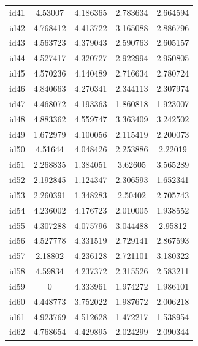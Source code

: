 \documentclass[num-refs]{wiley-article}
\begin{document}
\begin{center}
\begin{longtable}{ccccc}
id41      & 4.53007   & 4.186365       & 2.783634          & 2.664594          \\
id42      & 4.768412  & 4.413722       & 3.165088          & 2.886796          \\
id43      & 4.563723  & 4.379043       & 2.590763          & 2.605157          \\
id44      & 4.527417  & 4.320727       & 2.922994          & 2.950805          \\
id45      & 4.570236  & 4.140489       & 2.716634          & 2.780724          \\
id46      & 4.840663  & 4.270341       & 2.344113          & 2.307974          \\
id47      & 4.468072  & 4.193363       & 1.860818          & 1.923007          \\
id48      & 4.883362  & 4.559747       & 3.363409          & 3.242502          \\
id49      & 1.672979  & 4.100056       & 2.115419          & 2.200073          \\
id50      & 4.51644   & 4.048426       & 2.253886          & 2.22019           \\
id51      & 2.268835  & 1.384051       & 3.62605           & 3.565289          \\
id52      & 2.192845  & 1.124347       & 2.306593          & 1.652341          \\
id53      & 2.260391  & 1.348283       & 2.50402           & 2.705743          \\
id54      & 4.236002  & 4.176723       & 2.010005          & 1.938552          \\
id55      & 4.307288  & 4.075796       & 3.044488          & 2.95812           \\
id56      & 4.527778  & 4.331519       & 2.729141          & 2.867593          \\
id57      & 2.18802   & 4.236128       & 2.721101          & 3.180322          \\
id58      & 4.59834   & 4.237372       & 2.315526          & 2.583211          \\
id59      & 0         & 4.333961       & 1.974272          & 1.986101          \\
id60      & 4.448773  & 3.752022       & 1.987672          & 2.006218          \\
id61      & 4.923769  & 4.512628       & 1.472217          & 1.538954          \\
id62      & 4.768654  & 4.429895       & 2.024299          & 2.090344          \\

\end{longtable}
\end{center}
\end{document}
